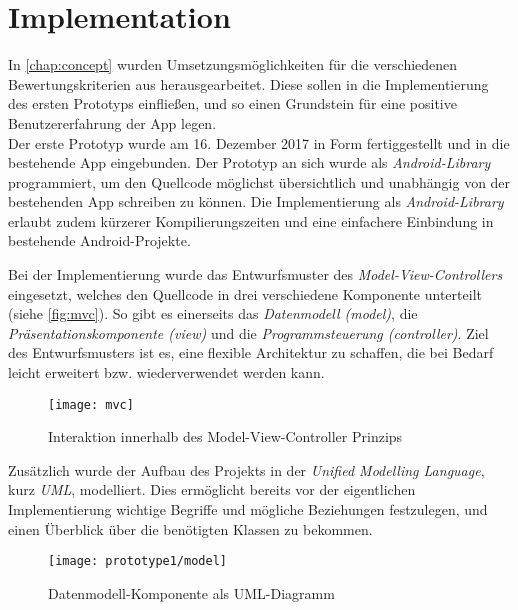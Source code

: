 \section{Implementation}\label{sec:pro1}
In \autoref{chap:concept} wurden Umsetzungsmöglichkeiten für die verschiedenen Bewertungskriterien aus  herausgearbeitet.
Diese sollen in die Implementierung des ersten Prototyps einfließen, und so einen Grundstein für eine positive Benutzererfahrung der App legen. \\

Der erste Prototyp wurde am 16. Dezember 2017 in Form fertiggestellt und in die bestehende App eingebunden.
Der Prototyp an sich wurde als \emph{Android-Library} programmiert, um den Quellcode möglichst übersichtlich und unabhängig von der bestehenden App schreiben zu können.
Die Implementierung als \emph{Android-Library} erlaubt zudem kürzerer Kompilierungszeiten und eine einfachere Einbindung in bestehende Android-Projekte. \\

Bei der Implementierung wurde das Entwurfsmuster des \emph{Model-View-Controllers} eingesetzt, welches den Quellcode in drei verschiedene Komponente unterteilt (siehe \autoref{fig:mvc}).
So gibt es einerseits das \emph{Datenmodell (model)}, die \emph{Präsentationskomponente (view)} und die \emph{Programmsteuerung (controller)}.
Ziel des Entwurfsmusters ist es, eine flexible Architektur zu schaffen, die bei Bedarf leicht erweitert bzw. wiederverwendet werden kann.

\begin{figure}[h]
  \centering
  \texttt{[image: mvc]}
  \caption{Interaktion innerhalb des Model-View-Controller Prinzips}
  \label{fig:mvc}
\end{figure}

\noindent
Zusätzlich wurde der Aufbau des Projekts in der \emph{Unified Modelling Language}, kurz \emph{UML}, modelliert.
Dies ermöglicht bereits vor der eigentlichen Implementierung wichtige Begriffe und mögliche Beziehungen festzulegen, und einen Überblick über die benötigten Klassen zu bekommen.

\begin{figure}[h]
  \centering
  \texttt{[image: prototype1/model]}
  \caption{Datenmodell-Komponente als UML-Diagramm}
  \label{fig:model1}
\end{figure}

